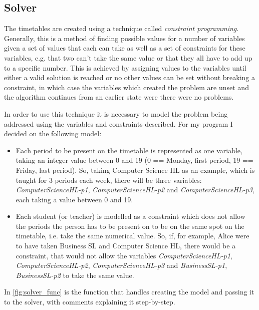 \documentclass[12pt]{article}
\begin{document}
\subsection{Solver}

The timetables are created using a technique called \emph{constraint programming}.
Generally, this is a method of finding possible values for a number of variables given a set
of values that each can take as well as a set of constraints for these variables, e.g. that
two can't take the same value or that they all have to add up to a specific number.  This is
achieved by assigning values to the variables until either a valid solution is reached or no
other values can be set without breaking a constraint, in which case the variables which
created the problem are unset and the algorithm continues from an earlier state were there
were no problems.

In order to use this technique it is necessary to model the problem being addressed using
the variables and constraints described. For my program I decided on the following model:
%
\begin{itemize}
    \item Each period to be present on the timetable is represented as one variable, taking
        an integer value between 0 and 19 (0 == Monday, first period, 19 == Friday, last
        period). So, taking Computer Science HL as an example, which is taught for 3 periods
        each week, there will be three variables: \textit{ComputerScienceHL-p1},
        \textit{ComputerScienceHL-p2} and \textit{ComputerScienceHL-p3}, each taking a value
        between 0 and 19.

    \item Each student (or teacher) is modelled as a constraint which does not allow the
        periods the person has to be present on to be on the same spot on the timetable,
        i.e. take the same numerical value. So, if, for example, Alice were to have taken
        Business SL and Computer Science HL, there would be a constraint, that would not
        allow the variables \textit{ComputerScienceHL-p1}, \textit{ComputerScienceHL-p2},
        \textit{ComputerScienceHL-p3} and \textit{BusinessSL-p1}, \textit{BusinessSL-p2} to
        take the same value.
\end{itemize}
%

In \autoref{fig:solver_func} is the function that handles creating the model and passing it
to the solver, with comments explaining it step-by-step.

\begin{figure}[H]
    \caption{}
    \inputminted{python}{solver_listing.py}
    \label{fig:solver_func}
\end{figure}

\printbibliography[type={software},title={Software \& Libraries}]
\printbibliography[type={online}, title={References}]
\end{document}
